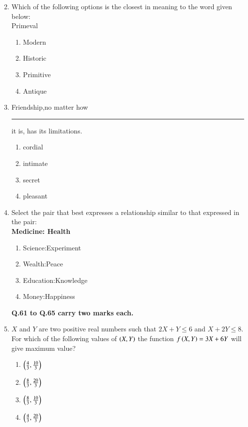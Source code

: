 \documentclass[journal]{IEEEtran}
\begin{document}
\begin{enumerate}
\begin{multicols}{4}
\end{multicols}
\item Which of the following options is the closest in meaning to the word given below:\\
Primeval
\begin{multicols}{2}
\begin{enumerate}
        \item Modern
        \item Historic
        \item Primitive
        \item Antique
    \end{enumerate}
\end{multicols}
\item Friendship,no matter how \rule{1.7cm}{0.2mm} it is, has its limitations.
\begin{enumerate}
    \item cordial
    \item intimate
    \item secret
    \item pleasant
\end{enumerate}
\item Select the pair that best expresses a relationship similar to that expressed in the pair:\\
\textbf{Medicine: Health}
\begin{multicols}{2}
\begin{enumerate}
    \item Science:Experiment
    \item Wealth:Peace
    \item Education:Knowledge
    \item Money:Happiness
\end{enumerate}
\end{multicols}
\textbf{Q.61 to Q.65 carry two marks each.}
\item $X$ and $Y$ are two positive real numbers such that $2X + Y \leq 6$ and $X + 2Y \leq8.$ For which of the following values of $\left(X,Y\right)$ the function $f\left(X,Y\right) = 3X + 6Y$ will give maximum value?
\begin{enumerate}
    \item $\left(\frac{4}{3},\frac{10}{3}\right)$
    \item $\left(\frac{8}{3},\frac{20}{3}\right)$
    \item $\left(\frac{8}{3},\frac{10}{3}\right)$
    \item $\left(\frac{4}{3},\frac{20}{3}\right)$
\end{enumerate}

\end{enumerate}
\end{document}
